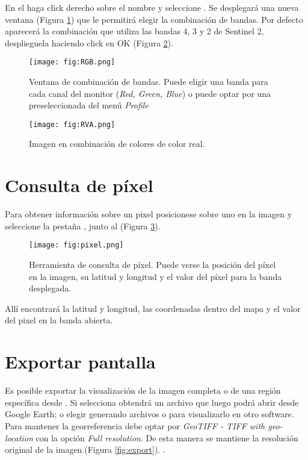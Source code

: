 En el  haga click derecho sobre el nombre y seleccione . Se desplegará una nueva ventana (Figura \ref{fig:RGB}) que le permitirá elegir la combinación de bandas. Por defecto aparecerá la combinación que utiliza las bandas 4, 3 y 2 de Sentinel 2, desplieguela haciendo click en OK (Figura \ref{fig:RVA}).

\begin{figure}[h!]
    \centering
    \texttt{[image: fig:RGB.png]}
    \caption{Ventana de combinación de bandas. Puede eligir una banda para cada canal del monitor (\emph{Red, Green, Blue}) o puede optar por una preseleccionada del menú \emph{Profile}}
    \label{fig:RGB}
\end{figure}

\begin{figure}[h!]
    \centering
    \texttt{[image: fig:RVA.png]}
    \caption{Imagen en combinación de colores de color real.}
    \label{fig:RVA}
\end{figure}


\section{Consulta de píxel}

Para obtener información sobre un pixel posicionese sobre uno en la imagen y seleccione la pestaña , junto al  (Figura \ref{fig:pixel}).

\begin{figure}[h!]
    \centering
    \texttt{[image: fig:pixel.png]}
    \caption{Herramienta de consulta de píxel. Puede verse la posición del píxel en la imagen, su latitud y longitud y el valor del píxel para la banda desplegada.}
    \label{fig:pixel}
\end{figure}

Allí encontrará la latitud y longitud, las coordenadas dentro del mapa y el valor del pixel en la banda abierta.

\section{Exportar pantalla}

Es posible exportar la visualización de la imagen completa o de una región específica desde . Si selecciona  obtendrá un archivo  que luego podrá abrir desde Google Earth; o elegir  generando archivos  o  para visualizarlo en otro software. Para mantener la georreferencia debe optar por \emph{GeoTIFF - TIFF with geo-location} con la opción \emph{Full resolution}. De esta manera se mantiene la resolución original de la imagen.(Figura \ref{fig:export}).
.

